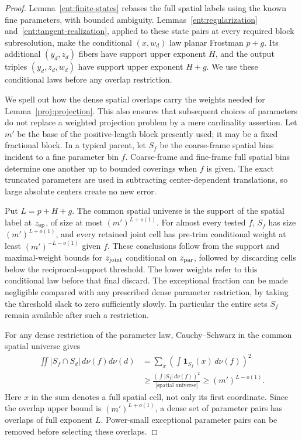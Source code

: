 \begin{proof}
Lemma~\ref{ent:finite-states} rebases the full spatial labels using
the known fine parameters, with bounded ambiguity.
Lemmas~\ref{ent:regularization} and~\ref{ent:tangent-realization},
applied to these state pairs at every required block subresolution,
make the conditional $(x,w_d)$ law planar Frostman $p+g$.
Its additional $(y_d,z_d)$ fibers have support upper exponent $H$,
and the output triples $(y_d,z_d,w_d)$ have support upper exponent
$H+g$. We use these conditional laws before any overlap restriction.

We spell out how the dense spatial overlaps carry the weights
needed for Lemma~\ref{proj:projection}. This also ensures that
subsequent choices of parameters do not replace a weighted
projection problem by a mere cardinality assertion. Let $m'$
be the base of the positive-length block presently used; it
may be a fixed fractional block. In a typical parent, let
$S_f$ be the coarse-frame spatial bins incident to a fine
parameter bin $f$. Coarse-frame and fine-frame full spatial
bins determine one another up to bounded coverings when $f$
is given. The exact truncated parameters are used in
subtracting center-dependent translations, so large absolute
centers create no new error.

Put $L=p+H+g$. The common spatial universe is the support of the
spatial label at $z_{\rm sp}$, of size at most $(m')^{L+o(1)}$.
For almost every
tested $f$, $S_f$ has size $(m')^{L+o(1)}$, and every retained
joint cell has pre-trim conditional weight at least
$(m')^{-L-o(1)}$ given $f$. These conclusions follow from the support
and maximal-weight bounds for $z_{\rm joint}$ conditional on
$z_{\rm par}$, followed by discarding cells below the
reciprocal-support threshold. The lower weights refer to this
conditional law before that final discard. The exceptional fraction
can be made negligible compared with any prescribed dense
parameter restriction, by taking the threshold slack to zero
sufficiently slowly. In particular the entire sets $S_f$
remain available after such a restriction.

For any dense restriction of the parameter law, Cauchy--Schwarz
in the common spatial universe gives
\begin{align*}
 \iint |S_f\cap S_d|\,d\nu(f)d\nu(d)
 &=\sum_x\left(\int\mathbf1_{S_f}(x)\,d\nu(f)\right)^2\\
 &\ge
 \frac{\left(\int |S_f|\,d\nu(f)\right)^2}
      {|\text{spatial universe}|}
 \ge (m')^{L-o(1)}.
\end{align*}
Here $x$ in the sum denotes a full spatial cell, not only its
first coordinate. Since the overlap upper bound is
$(m')^{L+o(1)}$, a dense set of parameter pairs has overlaps
of full exponent $L$. Power-small exceptional parameter pairs
can be removed before selecting these overlaps.


\end{proof}
